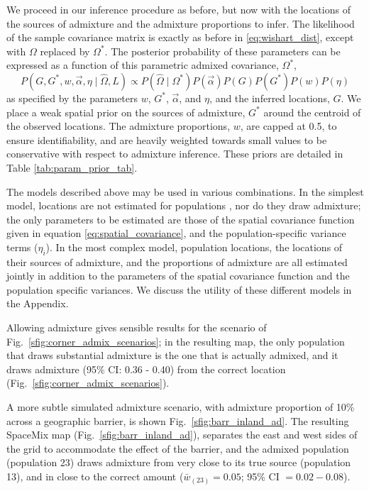 \documentclass[10pt,letterpaper]{article}
\newcommand{\identifyadmixsource}[1]{{#1^{*}}}
\begin{document}
We proceed in our inference procedure as before, but now with the locations of the sources of admixture and the admixture proportions to infer.
The likelihood of the sample covariance matrix is exactly as before in \eqref{eq:wishart_dist},
except with $\Omega$ replaced by $\identifyadmixsource{\Omega}$.
The posterior probability of these parameters can be expressed as a function of this parametric admixed covariance, $\identifyadmixsource{\Omega}$,
\begin{equation}
\label{eq:admixed_post_prob}
P(G,\identifyadmixsource{G}, w,\vec{\alpha}, \eta \mid \widehat{\Omega}, L) 
	\propto  
		P(\widehat{\Omega}  \mid \identifyadmixsource{\Omega}) P(\vec{\alpha}) P(G) P(\identifyadmixsource{G}) P(w) P(\eta) 
\end{equation}
as specified by the parameters $w$, $\identifyadmixsource{G}$, $\vec{\alpha}$, and $\eta$, and the inferred locations, $G$.  
We place a weak spatial prior on the sources of admixture, $\identifyadmixsource{G}$ around the centroid of the observed locations. The admixture proportions, $w$, are capped at 0.5, to ensure identifiability,
and are heavily weighted towards small values to be conservative with respect to admixture inference.  
These priors are detailed in Table \ref{tab:param_prior_tab}.

The models described above may be used in various combinations.  In the simplest model, locations are not estimated for populations , nor do they draw admixture; the only parameters to be estimated are those of the spatial covariance function given in equation \eqref{eq:spatial_covariance}, and the population-specific variance terms ($\eta_i$).  In the most complex model, population locations, the locations of their sources of admixture, and the proportions of admixture are all estimated jointly in addition to the parameters of the spatial covariance function and the population specific variances.  We discuss the utility of these different models in the Appendix.

Allowing admixture gives sensible results for the scenario of Fig.\ \ref{sfig:corner_admix_scenarios};
in the resulting map,
the only population that draws substantial admixture is the one that is actually admixed, 
and it draws admixture (95\% CI: 0.36 - 0.40) from the correct location (Fig.\ \ref{sfig:corner_admix_scenarios}).

A more subtle simulated admixture scenario, with admixture proportion of 10\% across a geographic barrier, 
is shown Fig.\ \ref{sfig:barr_inland_ad}.  
The resulting SpaceMix map (Fig.\ \ref{sfig:barr_inland_ad}), 
separates the east and west sides of the grid to accommodate the effect of the barrier,
and the admixed population (population 23) draws admixture from very close to its true source (population 13), 
and in close to the correct amount ($\bar{w}_{(23)} = 0.05$; 95\% CI $= 0.02-0.08$).
\end{document}
